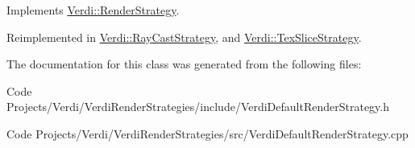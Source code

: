 \-Implements \hyperlink{class_verdi_1_1_render_strategy_a0e46a0f8434b471bf8b0c1c9b243e6d5}{\-Verdi\-::\-Render\-Strategy}.



\-Reimplemented in \hyperlink{class_verdi_1_1_ray_cast_strategy_a23af8b285ef2de2957f397b9674c7a01}{\-Verdi\-::\-Ray\-Cast\-Strategy}, and \hyperlink{class_verdi_1_1_tex_slice_strategy_abaf58e07219e1aab4d0016044da15f4d}{\-Verdi\-::\-Tex\-Slice\-Strategy}.



\-The documentation for this class was generated from the following files\-:\begin{DoxyCompactItemize}
\item 
\-Code Projects/\-Verdi/\-Verdi\-Render\-Strategies/include/\-Verdi\-Default\-Render\-Strategy.\-h\item 
\-Code Projects/\-Verdi/\-Verdi\-Render\-Strategies/src/\-Verdi\-Default\-Render\-Strategy.\-cpp\end{DoxyCompactItemize}
